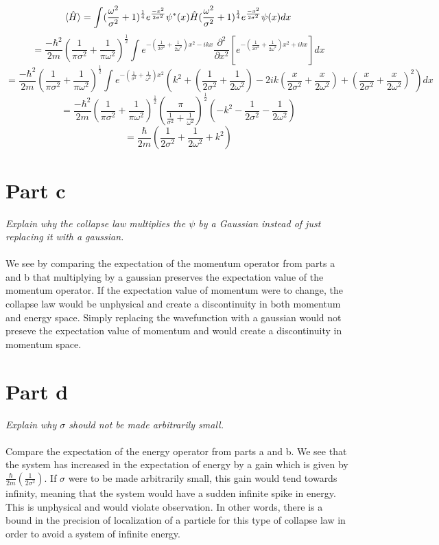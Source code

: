 \documentclass[11pt, a4paper]{article}
\begin{document}
\[\braket{\hat{H}} = \int (\frac{\omega^2}{\sigma^2}+1)^{\frac{1}{4}}e^{\frac{-x^2}{2\sigma^2}}\psi^*(x)\hat{H}(\frac{\omega^2}{\sigma^2}+1)^{\frac{1}{4}}e^{\frac{-x^2}{2\sigma^2}}\psi(x)dx\]
\[=\frac{-\hbar^2}{2m}(\frac{1}{\pi\sigma^2}+\frac{1}{\pi\omega^2})^\frac{1}{2}\int e^{-(\frac{1}{2\sigma^2}+\frac{1}{2\omega^2})x^2-ikx}\frac{\partial^2}{\partial x^2}[e^{-(\frac{1}{2\sigma^2}+\frac{1}{2\omega^2})x^2+ikx}]dx\]
\[=\frac{-\hbar^2}{2m}(\frac{1}{\pi\sigma^2}+\frac{1}{\pi\omega^2})^\frac{1}{2}\int e^{-(\frac{1}{\sigma^2}+\frac{1}{\omega^2})x^2}(k^2+(\frac{1}{2\sigma^2}+\frac{1}{2\omega^2})-2ik(\frac{x}{2\sigma^2}+\frac{x}{2\omega^2})+(\frac{x}{2\sigma^2}+\frac{x}{2\omega^2})^2)dx\]
\[=\frac{-\hbar^2}{2m}(\frac{1}{\pi\sigma^2}+\frac{1}{\pi\omega^2})^\frac{1}{2}(\frac{\pi}{\frac{1}{\sigma^2}+\frac{1}{\omega^2}})^{\frac{1}{2}}(-k^2-\frac{1}{2\sigma^2}-\frac{1}{2\omega^2})\]
\[\boxed{=\frac{\hbar}{2m}(\frac{1}{2\sigma^2}+\frac{1}{2\omega^2}+k^2)}\]

\section{Part c} \emph{Explain why the collapse law multiplies the $\psi$ by a
Gaussian instead of just replacing it with a gaussian.}
\\ \hfill \\
We see by comparing the expectation of the momentum operator from parts a and b
that multiplying by a gaussian preserves the expectation value of the momentum
operator. If the expectation value of momentum were to change, the collapse law
would be unphysical and create a discontinuity in both momentum and energy
space. Simply replacing the wavefunction with a gaussian would not preseve the 
expectation value of momentum and would create a discontinuity in momentum space.

\section{Part d} \emph{Explain why $\sigma$ should not be made arbitrarily
small.}
\\ \hfill \\
Compare the expectation of the energy operator from parts a and b. We see that
the system has increased in the expectation of energy by a gain which is given 
by $\frac{\hbar}{2m}(\frac{1}{2\sigma^2})$. If $\sigma$ were to be made
arbitrarily small, this gain would tend towards infinity, meaning that the
system would have a sudden infinite spike in energy. This is unphysical and
would violate observation. In other words, there is a bound in the precision of
localization of a particle for this type of collapse law in order to avoid a
system of infinite energy.
\end{document}
